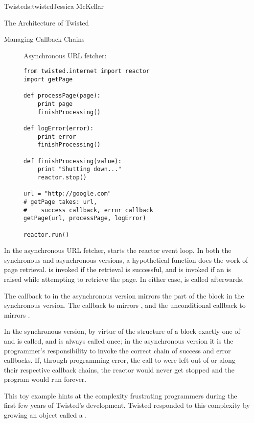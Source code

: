 \begin{aosachapter}{Twisted}{s:twisted}{Jessica McKellar}
\begin{aosasect1}{The Architecture of Twisted}
\begin{aosasect2}{Managing Callback Chains}
\begin{figure}[h!]
\begin{minipage}[t]{0.4\linewidth}
Asynchronous URL fetcher:

\centering

\begin{verbatim}
from twisted.internet import reactor
import getPage

def processPage(page):
    print page
    finishProcessing()

def logError(error):
    print error
    finishProcessing()

def finishProcessing(value):
    print "Shutting down..."
    reactor.stop()

url = "http://google.com"
# getPage takes: url, 
#    success callback, error callback
getPage(url, processPage, logError)

reactor.run()
\end{verbatim}
\end{minipage}
\end{figure}

\noindent In the asynchronous URL fetcher,
 starts the reactor event loop. 
In both the synchronous and asynchronous versions, a hypothetical
 function does the work of page
retrieval.  is invoked if the retrieval is successful,
and  is invoked if an  is raised
while attempting to retrieve the page. In either case,
 is called afterwards.

The callback to  in the asynchronous version mirrors the
 part of the  block in the synchronous
version. The callback to  mirrors , and
the unconditional callback to  mirrors
.

In the synchronous version, by virtue of the structure of a
 block exactly one of  and
 is called, and  is always
called once; in the asynchronous version it is the programmer's responsibility
to invoke the correct chain of success and error callbacks. If, through
programming error, the call to  were left out of
 or  along their respective
callback chains, the reactor would never get stopped and the program would run
forever.

This toy example hints at the complexity frustrating programmers during the
first few years of Twisted's development. Twisted responded to this complexity
by growing an object called a .


\end{aosasect2}
\end{aosasect1}
\end{aosachapter}
